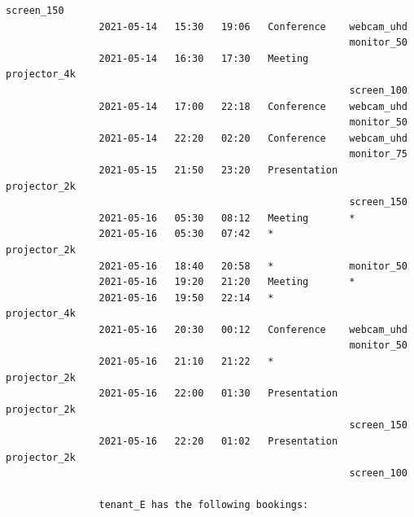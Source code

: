 \documentclass{article}
\begin{document}
\begin{Verbatim}[gobble=8]
                                                           screen_150
                2021-05-14   15:30   19:06   Conference    webcam_uhd
                                                           monitor_50
                2021-05-14   16:30   17:30   Meeting       projector_4k
                                                           screen_100
                2021-05-14   17:00   22:18   Conference    webcam_uhd
                                                           monitor_50
                2021-05-14   22:20   02:20   Conference    webcam_uhd
                                                           monitor_75
                2021-05-15   21:50   23:20   Presentation  projector_2k
                                                           screen_150
                2021-05-16   05:30   08:12   Meeting       *
                2021-05-16   05:30   07:42   *             projector_2k
                2021-05-16   18:40   20:58   *             monitor_50
                2021-05-16   19:20   21:20   Meeting       *
                2021-05-16   19:50   22:14   *             projector_4k
                2021-05-16   20:30   00:12   Conference    webcam_uhd
                                                           monitor_50
                2021-05-16   21:10   21:22   *             projector_2k
                2021-05-16   22:00   01:30   Presentation  projector_2k
                                                           screen_150
                2021-05-16   22:20   01:02   Presentation  projector_2k
                                                           screen_100
                
                tenant_E has the following bookings:
                

\end{Verbatim}
\end{document}
